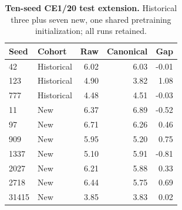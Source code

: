\begin{table}[t]\centering\small
\caption{\textbf{Ten-seed CE1/20 test extension.} Historical three plus seven new, one shared pretraining initialization; all runs retained.}
\label{tab:seedextension}\begin{tabular}{llrrr}\toprule
Seed & Cohort & Raw & Canonical & Gap\\\midrule
42 & Historical & 6.02 & 6.03 & -0.01\\
123 & Historical & 4.90 & 3.82 & 1.08\\
777 & Historical & 4.48 & 4.51 & -0.03\\
11 & New & 6.37 & 6.89 & -0.52\\
97 & New & 6.71 & 6.26 & 0.46\\
909 & New & 5.95 & 5.20 & 0.75\\
1337 & New & 5.10 & 5.91 & -0.81\\
2027 & New & 6.21 & 5.88 & 0.33\\
2718 & New & 6.44 & 5.75 & 0.69\\
31415 & New & 3.85 & 3.83 & 0.02\\
\bottomrule\end{tabular}\end{table}
